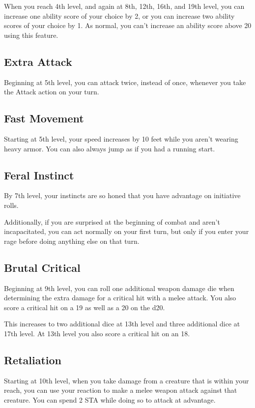 When you reach 4th level, and again at 8th, 12th, 16th, and 19th level, you can increase one ability score of your choice by 2, or you can increase two ability scores of your choice by 1. As normal, you can’t increase an ability score above 20 using this feature.

\subsection{Extra Attack}

Beginning at 5th level, you can attack twice, instead of once, whenever you take the Attack action on your turn.

\subsection{Fast Movement}

Starting at 5th level, your speed increases by 10 feet while you aren’t wearing heavy armor. You can also always jump as if you had a running start.

\subsection{Feral Instinct}

By 7th level, your instincts are so honed that you have advantage on initiative rolls.

Additionally, if you are surprised at the beginning of combat and aren’t incapacitated, you can act normally on your first turn, but only if you enter your rage before doing anything else on that turn.

\subsection{Brutal Critical}

Beginning at 9th level, you can roll one additional weapon damage die when determining the extra damage for a critical hit with a melee attack. You also score a critical hit on a 19 as well as a 20 on the d20.

This increases to two additional dice at 13th level and three additional dice at 17th level. At 13th level you also score a critical hit on an 18.

\subsection{Retaliation}
Starting at 10th level, when you take damage from a creature that is within your reach, you can use your reaction to make a melee weapon attack against that creature. You can spend 2 STA while doing so to attack at advantage.


